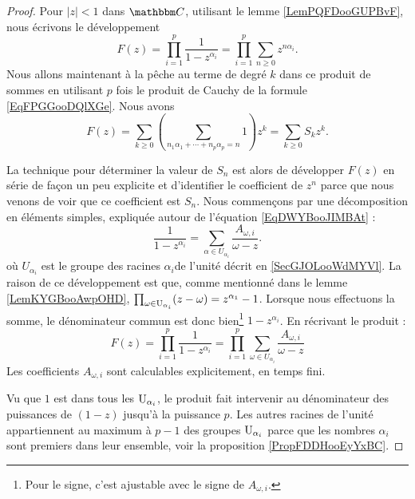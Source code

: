 \begin{proof}
    Pour \( | z |<1\) dans \( \eC\), utilisant le lemme \ref{LemPQFDooGUPBvF}, nous écrivons le développement
    \begin{equation}
        F(z)=\prod_{i=1}^p\frac{1}{ 1-z^{\alpha_i} }=\prod_{i=1}^p\sum_{n\geq 0}z^{n\alpha_i}.
    \end{equation}
    Nous allons maintenant à la pêche au terme de degré \( k\) dans ce produit de sommes en utilisant \( p\) fois le produit de Cauchy de la formule \eqref{EqFPGGooDQlXGe}. Nous avons
    \begin{equation}
        F(z)=\sum_{k\geq 0}\left( \sum_{n_1\alpha_1+\cdots +n_p\alpha_p=n}1 \right)z^k=\sum_{k\geq 0}S_kz^k.
    \end{equation}
    
    La technique pour déterminer la valeur de \( S_n\) est alors de développer \( F(z)\) en série de façon un peu explicite et d'identifier le coefficient de \( z^n\) parce que nous venons de voir que ce coefficient est \( S_n\). Nous commençons par une décomposition en éléments simples, expliquée autour de l'équation \eqref{EqDWYBooJIMBAt} :
    \begin{equation}
        \frac{1}{ 1-z^{\alpha_i} }=\sum_{\alpha\in U_{\alpha_i}}\frac{ A_{\omega,i} }{ \omega-z }.
    \end{equation}
    où \( U_{\alpha_i}\) est le groupe des racines \( \alpha_i\)\ieme de l'unité décrit en \ref{SecGJOLooWdMYVl}. La raison de ce développement est que, comme mentionné dans le lemme \ref{LemKYGBooAwpOHD}, \( \prod_{\omega\in\operatorname{U}_{\alpha_i}}(z-\omega)=z^{\alpha_1}-1\). Lorsque nous effectuons la somme, le dénominateur commun est donc bien\footnote{Pour le signe, c'est ajustable avec le signe de \( A_{\omega,i}\).} \( 1-z^{\alpha_i}\).
    En récrivant le produit :
    \begin{equation}
        F(z)=\prod_{i=1}^{p}\frac{1}{ 1-z^{\alpha_i} }=\prod_{i=1}^p\sum_{\omega\in U_{\alpha_i}}\frac{ A_{\omega,i} }{ \omega-z }
    \end{equation}
    Les coefficients \( A_{\omega,i}\) sont calculables explicitement, en temps fini.

    Vu que \( 1\) est dans tous les \( \operatorname{U}_{\alpha_i}\), le produit fait intervenir au dénominateur des puissances de \( (1-z)\) jusqu'à la puissance \( p\). Les autres racines de l'unité appartiennent au maximum à \( p-1\) des groupes \( \operatorname{U}_{\alpha_i}\) parce que les nombres \( \alpha_i\) sont premiers dans leur ensemble, voir la proposition \ref{PropFDDHooEyYxBC}.


\end{proof}
